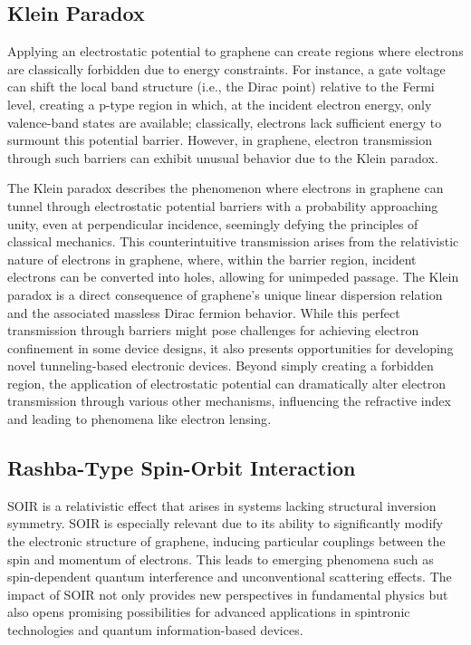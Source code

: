 \subsection{Klein Paradox}\label{subsec:kleinParadox}

Applying an electrostatic potential to graphene can create regions where electrons are classically forbidden due to energy constraints\cite{SoninPhysRevB2009}.
For instance, a gate voltage can shift the local band structure (i.e., the Dirac point) relative to the Fermi level, creating a p-type region in which, at the incident electron energy, only valence-band states are available; classically, electrons lack sufficient energy to surmount this potential barrier\cite{DellAnnaJPhysCondMatt2018}.
However, in graphene, electron transmission through such barriers can exhibit unusual behavior due to the Klein paradox\cite{Young2009}.

The Klein paradox describes the phenomenon where electrons in graphene can tunnel through electrostatic potential barriers with a probability approaching unity, even at perpendicular incidence, seemingly defying the principles of classical mechanics\cite{TrauzettelNature2007}.
This counterintuitive transmission arises from the relativistic nature of electrons in graphene, where, within the barrier region, incident electrons can be converted into holes, allowing for unimpeded passage\cite{BernardiniJPhysAMathTheor2010}.
The Klein paradox is a direct consequence of graphene's unique linear dispersion relation and the associated massless Dirac fermion behavior.
While this perfect transmission through barriers might pose challenges for achieving electron confinement in some device designs, it also presents opportunities for developing novel tunneling-based electronic devices.
Beyond simply creating a forbidden region, the application of electrostatic potential can dramatically alter electron transmission through various other mechanisms, influencing the refractive index and leading to phenomena like electron lensing\cite{ParedesPhysRevB2021}.

\subsection{Rashba-Type Spin-Orbit Interaction}\label{subsec:rashba-type-spin-orbit-interaction}

SOIR is a relativistic effect that arises in systems lacking structural inversion symmetry\cite{AvishaiPhysRevB2021}.
SOIR is especially relevant due to its ability to significantly modify the electronic structure of graphene, inducing particular couplings between the spin and momentum of electrons.
This leads to emerging phenomena such as spin-dependent quantum interference and unconventional scattering effects.
The impact of SOIR not only provides new perspectives in fundamental physics but also opens promising possibilities for advanced applications in spintronic technologies and quantum information-based devices.

